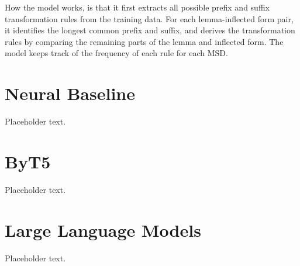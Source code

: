 How the model works, is that it first extracts all possible prefix and suffix transformation rules from the training data. For each lemma-inflected form pair, it identifies the longest common prefix and suffix, and derives the transformation rules by comparing the remaining parts of the lemma and inflected form. The model keeps track of the frequency of each rule for each MSD.


\section{Neural Baseline}

Placeholder text.

\section{ByT5}

Placeholder text.

\section{Large Language Models}

Placeholder text.